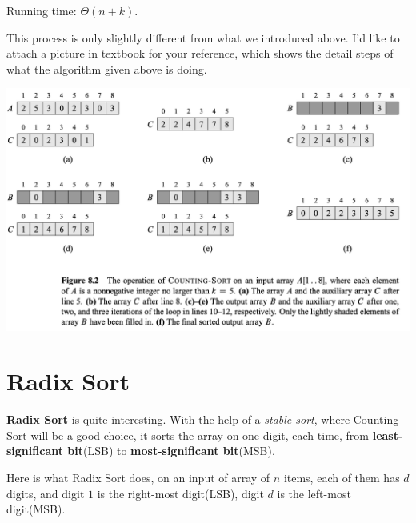 \begin{spacing}{1.3}
\begin{algorithm*}
    \end{algorithm*}
    Running time: $\Theta(n+k)$.

    This process is only slightly different from what we introduced above.
    I'd like to attach a picture in textbook for your reference, which 
    shows the detail steps of what the algorithm given above is doing.
    \begin{center}
        \includegraphics[scale=0.43]{images/06-counting-eg.png}
    \end{center}
    

    \section{Radix Sort}

    {\bf Radix Sort} is quite interesting. With the help of a {\it stable 
    sort}, where Counting Sort will be a good choice, it sorts the array 
    on one digit, each time, from {\bf least-significant bit}(LSB) to 
    {\bf most-significant bit}(MSB).

    Here is what Radix Sort does, on an input of array of $n$ items,
    each of them has $d$ digits, and digit $1$ is the right-most digit(LSB),
    digit $d$ is the left-most digit(MSB).


\end{spacing}
